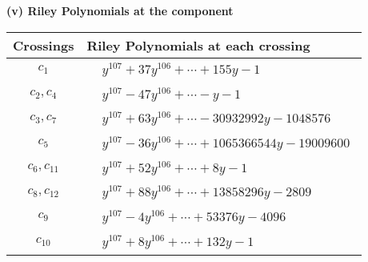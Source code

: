 \documentclass[1p]{elsarticle_modified}
\theoremstyle{definition}
\begin{document}
\newpage\renewcommand{\arraystretch}{1}
\flushleft \textbf{(v) Riley Polynomials at the component}\newline \\
\begin{tabular}{m{50pt}|m{274pt}}
Crossings & \hspace{64pt}Riley Polynomials at each crossing \\
\hline $$\begin{aligned}c_{1}\end{aligned}$$&$\begin{aligned}
&y^{107}+37 y^{106}+\cdots+155 y-1
\end{aligned}$\\
\hline $$\begin{aligned}c_{2},c_{4}\end{aligned}$$&$\begin{aligned}
&y^{107}-47 y^{106}+\cdots- y-1
\end{aligned}$\\
\hline $$\begin{aligned}c_{3},c_{7}\end{aligned}$$&$\begin{aligned}
&y^{107}+63 y^{106}+\cdots-30932992 y-1048576
\end{aligned}$\\
\hline $$\begin{aligned}c_{5}\end{aligned}$$&$\begin{aligned}
&y^{107}-36 y^{106}+\cdots+1065366544 y-19009600
\end{aligned}$\\
\hline $$\begin{aligned}c_{6},c_{11}\end{aligned}$$&$\begin{aligned}
&y^{107}+52 y^{106}+\cdots+8 y-1
\end{aligned}$\\
\hline $$\begin{aligned}c_{8},c_{12}\end{aligned}$$&$\begin{aligned}
&y^{107}+88 y^{106}+\cdots+13858296 y-2809
\end{aligned}$\\
\hline $$\begin{aligned}c_{9}\end{aligned}$$&$\begin{aligned}
&y^{107}-4 y^{106}+\cdots+53376 y-4096
\end{aligned}$\\
\hline $$\begin{aligned}c_{10}\end{aligned}$$&$\begin{aligned}
&y^{107}+8 y^{106}+\cdots+132 y-1
\end{aligned}$\\
\hline
\end{tabular}\\~\\
\end{document}
